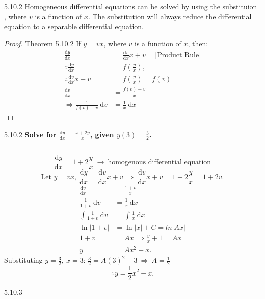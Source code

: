 \documentclass[12pt, a4paper]{article}
\def\d{{\mathrm{d}}}
\begin{document}
\begin{enumerate}
\begin{myclaim}{ }{}
    \end{myclaim}
    \begin{theorem}{5.10.2}{}
        Homogeneous differential equations can be solved by using the substituion \textbf{\color{red}{$y=vx$}}, where $v$ is a function of $x$. The substitution will always reduce the differential equation to a separable differential equation. 
        \begin{proof}{Theorem 5.10.2}{}
            If $y=vx$, where $v$ is a function of $x$, then: 
            $$\begin{aligned}
                \frac{\d y}{\d x}&=\frac{\d v}{\d x}x+v\ \ \ \ \ \ \text{[Product Rule]}\\
                \because \frac{\d y}{\d x}&=f\left(\frac{y}{x}\right),\\
                \therefore \frac{\d v}{\d x}x+v&=f\left(\frac{y}{x}\right)=f(v)\\
                \frac{\d v}{\d x}&=\frac{f(v)-v}{x}\\
                \Rightarrow \frac{1}{f(v)-v}\ \d v&=\frac{1}{x}\ \d x
            \end{aligned}$$
        \end{proof}
    \end{theorem}
    \begin{example}{5.10.2}{}
        \textbf{Solve for $\frac{\d y}{\d x}=\frac{x+2y}{x}$, given $y(3)=\frac{3}{2}$.}\\
        \noindent\rule[0.1pt]{\textwidth}{1pt}
        $$\frac{\d y}{\d x}=1+2\frac{y}{x}\ \rightarrow\ \text{homogenous differential equation}$$
        $$\text{Let }y=vx,\ \frac{\d y}{\d x}=\frac{\d v}{\d x}x+v\ \Rightarrow\ \frac{\d v}{\d x}x+v=1+2\frac{y}{x}=1+2v.$$
        $$\begin{aligned}
            \frac{\d v}{\d x}&=\frac{1+v}{x}\\
            \frac{1}{1+v}\ \d v&=\frac{1}{x}\ \d x\\
            \int \frac{1}{1+v}\ \d v&=\int \frac{1}{x}\ \d x\\
            \ln|1+v|&=\ln|x|+C=ln|Ax|\\
            1+v&=Ax\ \Rightarrow \frac{y}{x}+1=Ax\\
            y&=Ax^2-x.
        \end{aligned}$$
        Substituting $y=\frac{3}{2},\ x=3$: $\frac{3}{2}=A(3)^2-3\ \Rightarrow\ A=\frac{1}{2}$
        $$\therefore y=\frac{1}{2}x^2-x.$$
    \end{example}
    \begin{example}{5.10.3}{}

\end{example}
\end{enumerate}
\end{document}
